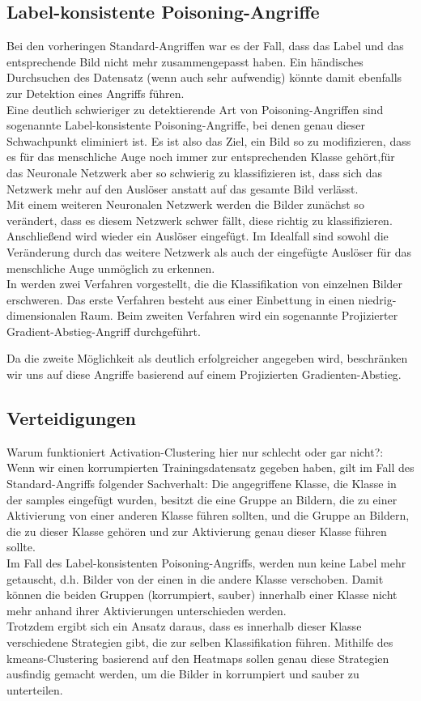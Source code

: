 \documentclass[twoside, 11pt,a4paper]{article}
\numberwithin{equation}{section}
\begin{document}
	\subsection{Label-konsistente Poisoning-Angriffe}
	Bei den vorheringen Standard-Angriffen war es der Fall, dass das Label und das entsprechende Bild nicht mehr zusammengepasst haben. Ein händisches Durchsuchen des Datensatz (wenn auch sehr aufwendig) könnte damit ebenfalls zur Detektion eines Angriffs führen.\\
	Eine deutlich schwieriger zu detektierende Art von Poisoning-Angriffen sind sogenannte Label-konsistente Poisoning-Angriffe, bei denen genau dieser Schwachpunkt eliminiert ist. Es ist also das Ziel, ein Bild so zu modifizieren, dass es für das menschliche Auge noch immer zur entsprechenden Klasse gehört,für das Neuronale Netzwerk aber so schwierig zu klassifizieren ist, dass sich das Netzwerk mehr auf den Auslöser anstatt auf das gesamte Bild verlässt.\\
	Mit einem weiteren Neuronalen Netzwerk werden die Bilder zunächst so verändert, dass es diesem Netzwerk schwer fällt, diese richtig zu klassifizieren. Anschließend wird wieder ein Auslöser eingefügt. Im Idealfall sind sowohl die Veränderung durch das weitere Netzwerk als auch der eingefügte Auslöser für das menschliche Auge unmöglich zu erkennen.\\
	
	In \cite{labelconsistent} werden zwei Verfahren vorgestellt, die die Klassifikation von einzelnen Bilder erschweren. Das erste Verfahren besteht aus einer Einbettung in einen niedrig-dimensionalen Raum.
	Beim zweiten Verfahren wird ein sogenannte Projizierter Gradient-Abstieg-Angriff durchgeführt.
	
	
	 Da die zweite Möglichkeit als deutlich erfolgreicher angegeben wird, beschränken wir uns auf diese Angriffe basierend auf einem Projizierten Gradienten-Abstieg.
	 
	 
	\subsection{Verteidigungen}
	Warum funktioniert Activation-Clustering hier nur schlecht oder gar nicht?: Wenn wir einen korrumpierten Trainingsdatensatz gegeben haben, gilt im Fall des Standard-Angriffs folgender Sachverhalt: Die angegriffene Klasse, die Klasse in der samples eingefügt wurden, besitzt die eine Gruppe an Bildern, die zu einer Aktivierung von einer anderen Klasse führen sollten, und die Gruppe an Bildern, die zu dieser Klasse gehören und zur Aktivierung genau dieser Klasse führen sollte.\\
	Im Fall des Label-konsistenten Poisoning-Angriffs, werden nun keine Label mehr getauscht, d.h. Bilder von der einen in die andere Klasse verschoben. Damit können die beiden Gruppen (korrumpiert, sauber) innerhalb einer Klasse nicht mehr anhand ihrer Aktivierungen unterschieden werden.\\
	Trotzdem ergibt sich ein Ansatz daraus, dass es innerhalb dieser Klasse verschiedene \glqq Strategien\grqq{}  gibt, die zur selben Klassifikation führen. Mithilfe des kmeans-Clustering basierend auf den Heatmaps sollen genau diese Strategien ausfindig gemacht werden, um die Bilder in korrumpiert und sauber zu unterteilen.
\end{document}
